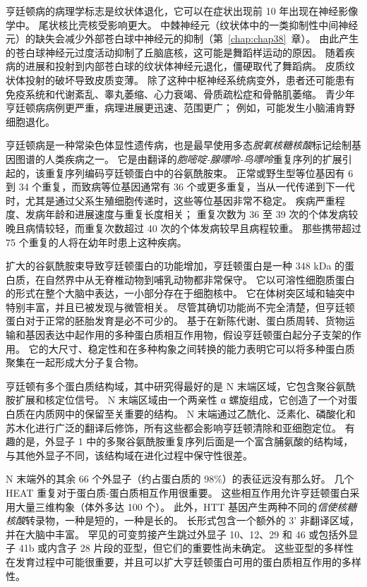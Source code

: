 亨廷顿病的病理学标志是纹状体退化，它可以在症状出现前 10 年出现在神经影像学中。
尾状核比壳核受影响更大。
中棘神经元（纹状体中的一类抑制性中间神经元）的缺失会减少外部苍白球中神经元的抑制（第~\ref{chap:chap38}~章）。
由此产生的苍白球神经元过度活动抑制了丘脑底核，这可能是舞蹈样运动的原因。
随着疾病的进展和投射到内部苍白球的纹状体神经元退化，僵硬取代了舞蹈病。
皮质纹状体投射的破坏导致皮质变薄。
除了这种中枢神经系统病变外，患者还可能患有免疫系统和代谢紊乱、睾丸萎缩、心力衰竭、骨质疏松症和骨骼肌萎缩。
青少年亨廷顿病病例更严重，病理进展更迅速、范围更广；
例如，可能发生小脑浦肯野细胞退化。


亨廷顿病是一种常染色体显性遗传病，也是最早使用多态\textit{脱氧核糖核酸}标记绘制基因图谱的人类疾病之一。
它是由翻译的\textit{胞嘧啶-腺嘌呤-鸟嘌呤}重复序列的扩展引起的，该重复序列编码亨廷顿蛋白中的谷氨酰胺束。
正常或野生型等位基因有 6 到 34 个重复，而致病等位基因通常有 36 个或更多重复，当从一代传递到下一代时，尤其是通过父系生殖细胞传递时，这些等位基因非常不稳定。
疾病严重程度、发病年龄和进展速度与重复长度相关；
重复次数为 36 至 39 次的个体发病较晚且病情较轻，而重复次数超过 40 次的个体发病较早且病程较重。
那些携带超过 75 个重复的人将在幼年时患上这种疾病。


扩大的谷氨酰胺束导致亨廷顿蛋白的功能增加，亨廷顿蛋白是一种 348 kDa 的蛋白质，在自然界中从无脊椎动物到哺乳动物都非常保守。
它以可溶性细胞质蛋白的形式在整个大脑中表达，一小部分存在于细胞核中。
它在体树突区域和轴突中特别丰富，并且已被发现与微管相关。
尽管其确切功能尚不完全清楚，但亨廷顿蛋白对于正常的胚胎发育是必不可少的。
基于在新陈代谢、蛋白质周转、货物运输和基因表达中起作用的多种蛋白质相互作用物，假设亨廷顿蛋白起分子支架的作用。
它的大尺寸、稳定性和在多种构象之间转换的能力表明它可以将多种蛋白质聚集在一起形成大分子复合物。


亨廷顿有多个蛋白质结构域，其中研究得最好的是 N 末端区域，它包含聚谷氨酰胺扩展和核定位信号。
N 末端区域由一个两亲性 α 螺旋组成，它创造了一个对蛋白质在内质网中的保留至关重要的结构。
N 末端通过乙酰化、泛素化、磷酸化和苏木化进行广泛的翻译后修饰，所有这些都会影响亨廷顿清除和亚细胞定位。
有趣的是，外显子 1 中的多聚谷氨酰胺重复序列后面是一个富含脯氨酸的结构域，与其他外显子不同，该结构域在进化过程中保守性很差。


N 末端外的其余 66 个外显子（约占蛋白质的 98\%）的表征远没有那么好。
几个 HEAT 重复对于蛋白质-蛋白质相互作用很重要。
这些相互作用允许亨廷顿蛋白采用大量三维构象（体外多达 100 个）。
此外，HTT 基因产生两种不同的\textit{信使核糖核酸}转录物，一种是短的，一种是长的。
长形式包含一个额外的 3' 非翻译区域，并在大脑中丰富。
罕见的可变剪接产生跳过外显子 10、12、29 和 46 或包括外显子 41b 或内含子 28 片段的亚型，但它们的重要性尚未确定。
这些亚型的多样性在发育过程中可能很重要，并且可以扩大亨廷顿蛋白可用的蛋白质相互作用的多样性。



